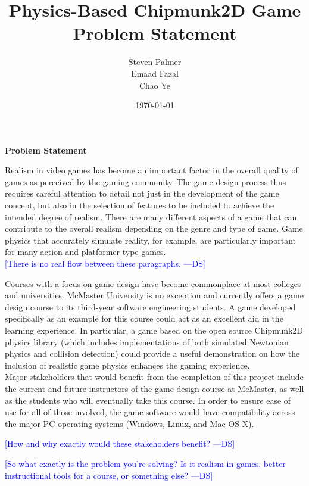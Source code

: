 \documentclass[12pt, titlepage]{article}
\newcommand{\authornote}[3]{\textcolor{#1}{[#3 ---#2]}}
\newcommand{\authornote}[3]{}
\newcommand{\ds}[1]{\authornote{blue}{DS}{#1}} %
\begin{document}
\title{\bf Physics-Based Chipmunk2D Game\\[\baselineskip]\Large Problem Statement}
\author{Steven Palmer\\Emaad Fazal\\Chao Ye}
\date{\today}
	
\maketitle

\begin{center}
\Large \bf Problem Statement
\end{center}

Realism in video games has become an important factor in the overall quality of games as perceived by the gaming community.  The game design process thus requires careful attention to detail not just in the development of the game concept, but also in the selection of features to be included to achieve the intended degree of realism.  There are many different aspects of a game that can contribute to the overall realism depending on the genre and type of game.  Game physics that accurately simulate reality, for example, are particularly important for many action and platformer type games.\\

\ds{There is no real flow between these paragraphs.}

Courses with a focus on game design have become commonplace at most colleges and universities.  McMaster University is no exception and currently offers a game design course to its third-year software engineering students.  A game developed specifically as an example for this course could act as an excellent aid in the learning experience.  In particular, a game based on the open source Chipmunk2D physics library (which includes implementations of both simulated Newtonian physics and collision detection) could provide a useful demonstration on how the inclusion of realistic game physics enhances the gaming experience.\\

Major stakeholders that would benefit from the completion of this project include the current and future instructors of the game design course at McMaster, as well as the students who will eventually take this course.  In order to ensure ease of use for all of those involved, the game software would have compatibility across the major PC operating systems (Windows, Linux, and Mac OS X).

\ds{How and why exactly would these stakeholders benefit?}


\ds{So what exactly is the problem you're solving? Is it realism in games, better instructional tools for a course, or something else?}
\end{document}
